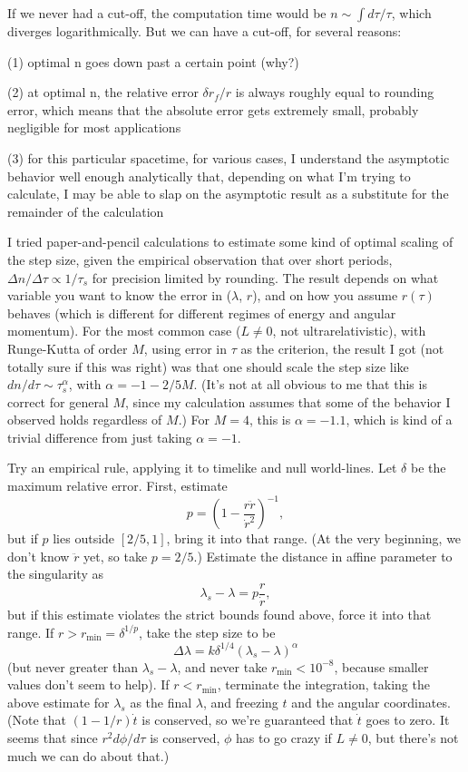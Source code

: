\documentclass{article}
\begin{document}
If we
never had a cut-off, the computation time would be $n\sim \int d\tau/\tau$, which diverges
logarithmically. But we can have a cut-off, for several reasons:

(1) optimal n goes down
past a certain point (why?)

(2) at optimal n, the relative error $\delta r_f/r$ is always roughly equal to rounding
error, which means that the absolute error gets extremely small, probably negligible for
most applications

(3) for this particular spacetime, for various cases, I understand the asymptotic behavior
well enough analytically that, depending on what I'm trying to calculate, I may be able
to slap on the asymptotic result as a substitute for the remainder of the calculation

I tried paper-and-pencil calculations to estimate some kind of optimal scaling of the
step size, given the empirical observation that over short periods,
$\Delta n/\Delta \tau \propto 1/\tau_s$ for precision limited by rounding. The result
depends on what variable you want to know the error in ($\lambda$, $r$), and on how
you assume $r(\tau)$ behaves (which is different for different regimes of energy and
angular momentum). For the most common case ($L\ne0$, not ultrarelativistic), with
Runge-Kutta of order $M$, using error in $\tau$ as the criterion, the result I got
(not totally sure if this was right) was that one should scale the step size like
$dn/d\tau \sim \tau_s^\alpha$, with $\alpha=-1-2/5M$. (It's not at all obvious to me that
this is correct for general $M$, since my calculation assumes that some of the behavior
I observed holds regardless of $M$.) For $M=4$, this is $\alpha=-1.1$, which is kind
of a trivial difference from just taking $\alpha=-1$.

Try an empirical rule, applying it to timelike and null world-lines.
Let $\delta$ be the maximum relative error.
First, estimate
\begin{equation*}
  p = \left(1-\frac{r \ddot{r}}{\dot{r}^2}\right)^{-1},
\end{equation*}
but if $p$ lies outside $[2/5,1]$, bring it into that range.
(At the very beginning, we don't know $\ddot{r}$ yet, so take $p=2/5$.)
Estimate the distance in
affine parameter to the singularity as
\begin{equation*}
  \lambda_s-\lambda = p\frac{r}{\dot{r}},
\end{equation*}
but if this estimate violates the strict bounds found above, force it into that range.
If $r>r_\text{min}=\delta^{1/p}$, take the step size to be
\begin{equation*}
  \Delta\lambda=k\delta^{1/4}(\lambda_s-\lambda)^\alpha
\end{equation*}
(but never greater than $\lambda_s-\lambda$, and never take $r_\text{min}<10^{-8}$, because
smaller values don't seem to help).
If $r<r_\text{min}$, terminate the integration, taking the above estimate for $\lambda_s$
as the final $\lambda$, and freezing $t$ and the angular coordinates. (Note that
$(1-1/r)\dot{t}$ is conserved, so we're guaranteed that $\dot{t}$ goes to zero. It seems
that since $r^2 d\phi/d\tau$ is conserved, $\phi$ has to go crazy if $L\ne0$, but there's
not much we can do about that.)
\end{document}
